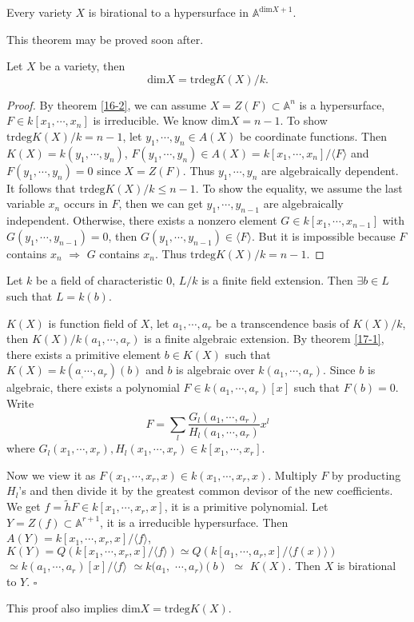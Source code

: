 \begin{theorem}\label{16-2}
	Every variety $ X $ is birational to a hypersurface in $ \mathbb{A}^{\mathrm{dim}X+1} $.
\end{theorem}
This theorem may be proved soon after.
\begin{theorem}
	Let $ X $ be a variety, then
	$$
		\mathrm{dim} X=\mathrm{trdeg} K(X)/k.
	$$
\end{theorem}
\begin{proof}
	By theorem \ref{16-2}, we can assume $ X=Z(F)\subset \mathbb{A}^n $ is a hypersurface, $ F\in k[x_1,\cdots,x_n] $ is irreducible. We know $ \mathrm{dim}X=n-1 $. To show $ \text{trdeg}K(X)/k=n-1 $, let $ y_1,\cdots,y_n\in A(X) $ be coordinate functions. Then $ K(X)=k(y_1,\cdots,y_n) $, $ F(y_1,\cdots,y_n)\in A(X)=k[x_1,\cdots,x_n]/\langle F \rangle $ and $ F(y_1,\cdots,y_n)=0 $ since $ X=Z(F) $. Thus $ y_1,\cdots,y_n $ are algebraically dependent. It follows that $ \text{trdeg}K(X)/k\leq n-1 $. To show the equality, we assume the last variable $ x_n $ occurs in $ F $, then we can get $ y_1,\cdots,y_{n-1} $ are algebraically independent. Otherwise, there exists a nonzero element $ G\in k[x_1,\cdots,x_{n-1}] $ with $ G(y_1,\cdots,y_{n-1})=0 $, then $ G(y_1,\cdots,y_{n-1})\in \langle F\rangle  $. But it is impossible because $ F $ contains $ x_n $ $ \Rightarrow $ $ G $ contains $ x_n $. Thus $ \text{trdeg}K(X)/k=n-1 $.
\end{proof}
\begin{theorem}\label{17-1}
	Let $ k $ be a field of characteristic $ 0 $, $ L/k $ is a finite field extension. Then $ \exists b\in L $ such that $ L=k(b) $.
\end{theorem}
	$ K(X) $ is function field of $ X $, let $ a_1,\cdots,a_r $ be a transcendence basis of $ K(X)/k $, then $ K(X)/k(a_1,\cdots,a_r) $ is a finite algebraic extension. By theorem  \ref{17-1}, there exists a primitive element $ b\in K(X) $ such that  $ K(X)=k(a_,\cdots,a_r)(b) $ and $ b $ is algebraic over $ k(a_1,\cdots,a_r) $. Since $ b $ is algebraic, there exists a polynomial $ F\in k(a_1,\cdots,a_r)[x] $ such that $ F(b)=0 $. Write
	$$
		F=\sum\limits_{l}\frac{G_l(a_1,\cdots,a_r)}{H_l(a_1,\cdots,a_r)}x^l
	$$
	where $ G_l(x_1,\cdots,x_r),H_l(x_1,\cdots,x_r)\in k[x_1,\cdots,x_r] $.

	Now we view it as $ F(x_1,\cdots,x_r,x)\in k(x_1,\cdots,x_r,x) $. Multiply $ F $ by producting $ H_l $'s and then  divide it by the greatest common devisor of the new coefficients. We get $ f=\tilde{h}F\in k[x_1,\cdots,x_r,x] $, it is a primitive polynomial. Let $ Y=Z(f)\subset \mathbb{A}^{r+1} $, it is a irreducible hypersurface. Then $ A(Y)=k[x_1,\cdots,x_r,x]/\langle f\rangle $, $ K(Y)=Q(k[x_1,\cdots,x_r,x]/\langle f\rangle)\simeq Q(k[a_1,\cdots,a_r,x]/\langle f(x) \rangle) $ $ \simeq k(a_1,\cdots,a_r)[x]/\langle f\rangle$ $\simeq k(a_1,$ $\cdots,a_r)(b) $ $ \simeq $ $ K(X) $. Then $ X $ is birational to $ Y $.
\hfill $\square$\par
This proof also implies $ \mathrm{dim}X=\mathrm{trdeg}K(X) $.

